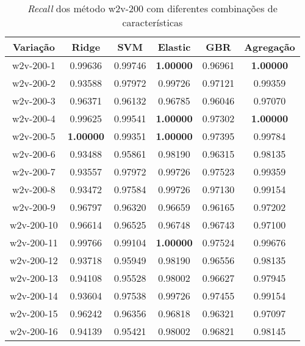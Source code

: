 \begin{table}[H]
\centering
\begin{tabular}{|c| c c  c  c  c| }
\hline
Variação &  Ridge & SVM & Elastic & GBR & Agregação  \\ 
\hline
w2v-200-1 & 0.99636 & 0.99746 & \textbf{1.00000} & 0.96961 & \textbf{1.00000} \\
\hline
w2v-200-2 & 0.93588 & 0.97972 & 0.99726 & 0.97121 & 0.99359 \\
\hline
w2v-200-3 & 0.96371 & 0.96132 & 0.96785 & 0.96046 & 0.97070 \\
\hline
w2v-200-4 & 0.99625 & 0.99541 & \textbf{1.00000} & 0.97302 & \textbf{1.00000} \\
\hline
w2v-200-5 & \textbf{1.00000} & 0.99351 & \textbf{1.00000} & 0.97395 & 0.99784 \\
\hline
w2v-200-6 & 0.93488 & 0.95861 & 0.98190 & 0.96315 & 0.98135 \\
\hline
w2v-200-7 & 0.93557 & 0.97972 & 0.99726 & 0.97523 & 0.99359 \\
\hline
w2v-200-8 & 0.93472 & 0.97584 & 0.99726 & 0.97130 & 0.99154 \\
\hline
w2v-200-9 & 0.96797 & 0.96320 & 0.96659 & 0.96165 & 0.97202 \\
\hline
w2v-200-10 & 0.96614 & 0.96525 & 0.96748 & 0.96743 & 0.97100 \\
\hline
w2v-200-11 & 0.99766 & 0.99104 & \textbf{1.00000} & 0.97524 & 0.99676 \\
\hline
w2v-200-12 & 0.93718 & 0.95949 & 0.98190 & 0.96556 & 0.98135 \\
\hline
w2v-200-13 & 0.94108 & 0.95528 & 0.98002 & 0.96627 & 0.97945 \\
\hline
w2v-200-14 & 0.93604 & 0.97538 & 0.99726 & 0.97455 & 0.99154 \\
\hline
w2v-200-15 & 0.96242 & 0.96356 & 0.96818 & 0.96321 & 0.97097 \\
\hline
w2v-200-16 & 0.94139 & 0.95421 & 0.98002 & 0.96821 & 0.98145 \\
\hline
\end{tabular}
\caption{\textit{Recall} dos método w2v-200 com diferentes combinações de características}
\label{tab:recallw2v200}
\end{table}

